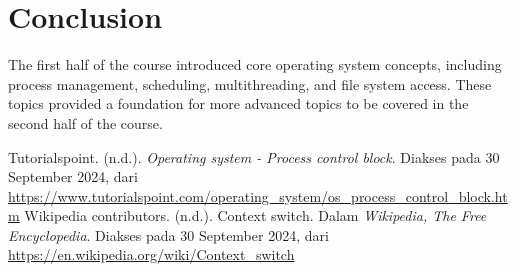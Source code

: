 \documentclass[12pt]{article}
\begin{document}
\section{Conclusion}
The first half of the course introduced core operating system concepts, including process management, scheduling, multithreading, and file system access. These topics provided a foundation for more advanced topics to be covered in the second half of the course.

\begin{thebibliography}{}
    \bibitem{}
    Tutorialspoint. (n.d.). \textit{Operating system - Process control block}. Diakses pada 30 September 2024, dari \url{https://www.tutorialspoint.com/operating_system/os_process_control_block.htm}
    \bibitem{}
    Wikipedia contributors. (n.d.). Context switch. Dalam \textit{Wikipedia, The Free Encyclopedia}. Diakses pada 30 September 2024, dari \url{https://en.wikipedia.org/wiki/Context_switch} 
\end{thebibliography}
\end{document}
